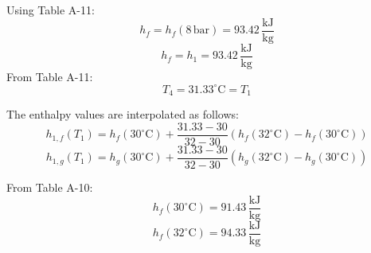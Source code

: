 Using Table A-11:  
\[
h_f = h_f(8 \, \text{bar}) = 93.42 \, \frac{\text{kJ}}{\text{kg}}
\]  
\[
h_f = h_1 = 93.42 \, \frac{\text{kJ}}{\text{kg}}
\]  
From Table A-11:  
\[
T_4 = 31.33^\circ\text{C} = T_1
\]  

The enthalpy values are interpolated as follows:  
\[
h_{1,f}(T_1) = h_f(30^\circ\text{C}) + \frac{31.33 - 30}{32 - 30} \left( h_f(32^\circ\text{C}) - h_f(30^\circ\text{C}) \right)
\]  
\[
h_{1,g}(T_1) = h_g(30^\circ\text{C}) + \frac{31.33 - 30}{32 - 30} \left( h_g(32^\circ\text{C}) - h_g(30^\circ\text{C}) \right)
\]  

From Table A-10:  
\[
h_f(30^\circ\text{C}) = 91.43 \, \frac{\text{kJ}}{\text{kg}}
\]  
\[
h_f(32^\circ\text{C}) = 94.33 \, \frac{\text{kJ}}{\text{kg}}
\]